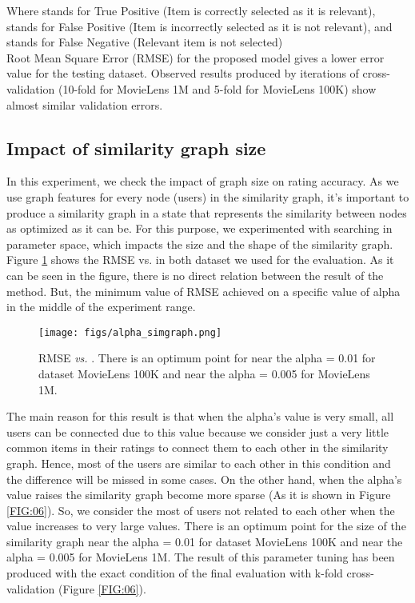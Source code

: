\documentclass[a4paper,fleqn]{cas-dc}
\begin{document}
Where  stands for True Positive (Item is correctly selected as it is relevant),  stands for False Positive (Item is incorrectly selected as it is not relevant), and  stands for False Negative (Relevant item is not selected)\\

Root Mean Square Error (RMSE) for the proposed model gives a lower error value for the testing dataset. Observed results produced by iterations of cross-validation (10-fold for MovieLens 1M and 5-fold for MovieLens 100K) show almost similar validation errors.

\subsection{Impact of similarity graph size}
\label{test:simgraph}
In this experiment, we check the impact of graph size on rating accuracy. As we use graph features for every node (users) in the similarity graph, it's important to produce a similarity graph in a state that represents the similarity between nodes as optimized as it can be. For this purpose, we experimented with searching in parameter space, which impacts the size and the shape of the similarity graph. Figure \ref{FIG:07} shows the RMSE vs.  in both dataset we used for the evaluation. As it can be seen in the figure, there is no direct relation between the result of the method. But, the minimum value of RMSE achieved on a specific value of alpha in the middle of the experiment range.

\begin{figure}
	\centering
	\texttt{[image: figs/alpha\_simgraph.png]}
	\caption{RMSE \textit{vs.} . There is an optimum point for  near the alpha = 0.01 for dataset MovieLens 100K and near the alpha = 0.005 for MovieLens 1M.}
	\label{FIG:07}
\end{figure}


The main reason for this result is that when the alpha's value is very small, all users can be connected due to this value because we consider just a very little common items in their ratings to connect them to each other in the similarity graph. Hence, most of the users are similar to each other in this condition and the difference will be missed in some cases. On the other hand, when the alpha's value raises the similarity graph become more sparse (As it is shown in Figure \ref{FIG:06}). So, we consider the most of users not related to each other when the  value increases to very large values. There is an optimum point for the size of the similarity graph near the alpha = 0.01 for dataset MovieLens 100K and near the alpha = 0.005 for MovieLens 1M. The result of this parameter tuning has been produced with the exact condition of the final evaluation with k-fold cross-validation (Figure \ref{FIG:06}).
\end{document}
